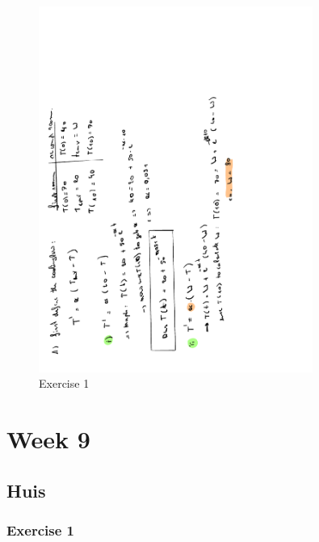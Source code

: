 \documentclass[a4paper]{report}
\begin{document}
\begin{figure}[H]
	\centering
	\includegraphics[angle=-90,width=0.8\textwidth]{assets/wc_8_ex_1.pdf}
	\caption{Exercise 1}
	\label{fig:wc_8_ex_1}
\end{figure}

\section{Week 9}

\subsection{Huis}

\subsubsection{Exercise 1}
\end{document}
